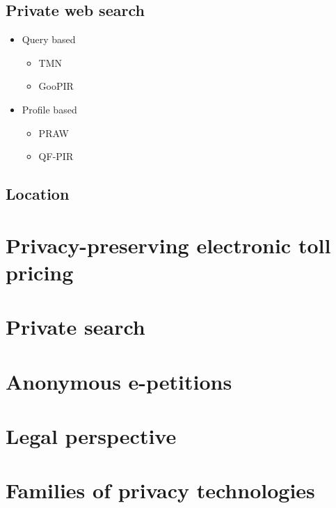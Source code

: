 \documentclass[a4paper,12pt,dutch]{article}
\begin{document}
\subsection{Private web search}
\begin{itemize}
	\item Query based
	\begin{itemize}
		\item TMN
		\item GooPIR
	\end{itemize}
	\item Profile based
	\begin{itemize}
		\item PRAW
		\item QF-PIR
	\end{itemize}
\end{itemize}
\subsection{Location}

\section{Privacy-preserving electronic toll pricing}

\section{Private search}

\section{Anonymous e-petitions}

\section{Legal perspective}

\section{Families of privacy technologies}
\end{document}
